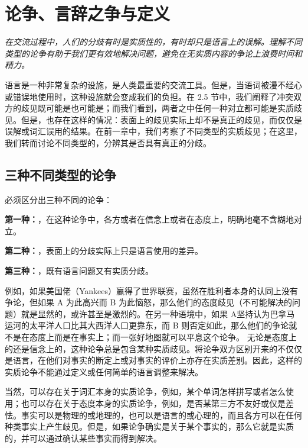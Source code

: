 \section{论争、言辞之争与定义}

\begin{logicbox}[title=引言]
\textit{在交流过程中，人们的分歧有时是实质性的，有时却只是语言上的误解。理解不同类型的论争有助于我们更有效地解决问题，避免在无实质内容的争论上浪费时间和精力。}
\end{logicbox}

语言是一种非常复杂的设施，是人类最重要的交流工具。但是，当语词被漫不经心或错误地使用时，这种设施就会变成我们的负担。在 2.5 节中，我们阐释了冲突双方的歧见既可能是也可能是；而我们看到，两者之中任何一种对立都可能是实质歧见。但是，也存在这样的情况：表面上的歧见实际上却不是真正的歧见，而仅仅是误解或词汇误用的结果。在前一章中，我们考察了不同类型的实质歧见；在这里，我们转而讨论不同类型的，分辨其是否具有真正的分歧。

\subsection{三种不同类型的论争}

\begin{theorembox}[title=三种论争类型]
必须区分出三种不同的论争：

\textbf{第一种：}，在这种论争中，各方或者在信念上或者在态度上，明确地毫不含糊地对立。

\textbf{第二种：}，表面上的分歧实际上只是语言使用的差异。

\textbf{第三种：}，既有语言问题又有实质分歧。
\end{theorembox}

例如，如果美国佬（Yankees）赢得了世界联赛，虽然在胜利者本身的认同上没有争论，但如果 A 为此高兴而 B 为此恼怒，那么他们的态度歧见（不可能解决的问题）就是显然的，或许甚至是激烈的。在另一种语境中，如果 A坚持认为巴拿马运河的太平洋人口比其大西洋人口更靠东，而 B 则否定如此，那么他们的争论就不是在态度上而是在事实上；而一张好地图就可以平息这个论争。 无论是态度上的还是信念上的，这种论争总是包含某种实质歧见。将论争双方区别开来的不仅仅是语言，在他们对事实的断定上或对事实的评价上亦存在实质差别。因此，这样的实质论争不能通过定义或任何简单的语言调整来解决。

当然，可以存在关于词汇本身的实质论争，例如，某个单词怎样拼写或者怎么使用；也可以存在关于态度本身的实质论争，例如，是否某第三方不友好或仅是差怯。事实可以是物理的或地理的，也可以是语言的或心理的，而且各方可以在任何种类事实上产生歧见。但是，如果论争确实是关于某个事实的，那么它就是实质的，并可以通过确认某些事实而得到解决。

